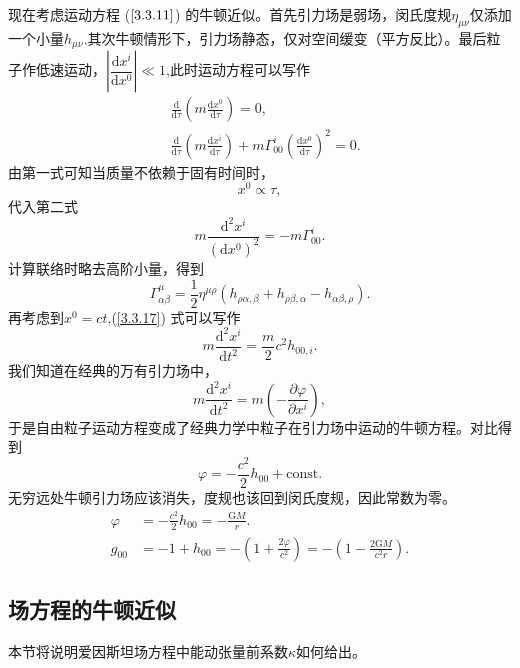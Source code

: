 \documentclass[11pt, a4paper, oneside, onecolumn]{ctexart}
\numberwithin{equation}{subsection}
\begin{document}
现在考虑运动方程 ($\ref{3.3.11}$) 的牛顿近似。首先引力场是弱场，闵氏度规$\eta_{\mu\nu}$仅添加一个小量$h_{\mu\nu}$.其次牛顿情形下，引力场静态，仅对空间缓变（平方反比）。最后粒子作低速运动，$\left\vert{}\dfrac{\mathrm{d}x^{i}}{\mathrm{d}x^{0}}\right\vert{}\ll1$,此时运动方程可以写作
\begin{align}
&\frac{\mathrm{d}}{\mathrm{d}\tau}\left(m\frac{\mathrm{d}x^{0}}{\mathrm{d}\tau}\right)=0,\\
&\frac{\mathrm{d}}{\mathrm{d}\tau}\left(m\frac{\mathrm{d}x^{i}}{\mathrm{d}\tau}\right)+m\Gamma_{00}^{i}\left(\frac{\mathrm{d}x^{0}}{\mathrm{d}\tau}\right)^{2}=0.
\end{align}
由第一式可知当质量不依赖于固有时间时，
\begin{equation}
x^{0}\propto{}\tau,
\end{equation}
代入第二式
\begin{equation}
m\frac{\mathrm{d}^{2}x^{i}}{\left(\mathrm{d}x^{0}\right)^{2}}=-m\Gamma_{00}^{i}.\label{3.3.17}
\end{equation}
计算联络时略去高阶小量，得到
\begin{equation}
\Gamma_{\alpha\beta}^{\mu}=\frac{1}{2}\eta^{\mu\rho}\left(h_{\rho\alpha,\beta}+h_{\rho\beta,\alpha}-h_{\alpha\beta,\rho}\right).
\end{equation}
再考虑到$x^{0}=ct$,(\ref{3.3.17}) 式可以写作
\begin{equation}
m\frac{\mathrm{d}^{2}x^{i}}{\mathrm{d}t^{2}}=\frac{m}{2}c^{2}h_{00,i}.
\end{equation}
我们知道在经典的万有引力场中，
\begin{equation}
m\frac{\mathrm{d}^{2}x^{i}}{\mathrm{d}t^{2}}=m\left(-\frac{\partial{}\varphi}{\partial{}x^{i}}\right),
\end{equation}
于是自由粒子运动方程变成了经典力学中粒子在引力场中运动的牛顿方程。对比得到
\begin{equation}
\varphi=-\frac{c^{2}}{2}h_{00}+\text{const}.
\end{equation}
无穷远处牛顿引力场应该消失，度规也该回到闵氏度规，因此常数为零。
\begin{align}
\varphi&=-\frac{c^{2}}{2}h_{00}=-\frac{\mathrm{G}M}{r}.\\
g_{00}&=-1+h_{00}=-\left(1+\frac{2\varphi}{c^{2}}\right)=-\left(1-\frac{2\mathrm{G}M}{c^{2}r}\right).
\end{align}

\subsection{场方程的牛顿近似}
本节将说明爱因斯坦场方程中能动张量前系数$\kappa$如何给出。
\end{document}
